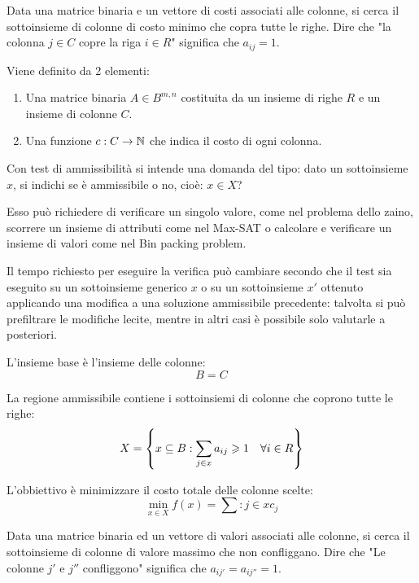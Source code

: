 \documentclass[\main/main.tex]{subfiles}
\begin{document}
\clearpage
\begin{multicols}{2}
    \begin{problem}
        Data una matrice binaria e un vettore di costi associati alle colonne, si cerca il sottoinsieme di colonne di costo minimo che copra tutte le righe. Dire che "la colonna \(j \in C\) copre la riga \(i \in R\)" significa che \(a_{ij} = 1\).
    
        Viene definito da 2 elementi:
        \begin{enumerate}
            \item Una matrice binaria \(A \in B^{m, n}\) costituita da un insieme di righe \(R\) e un insieme di colonne \(C\).
            \item Una funzione \(c: C \rightarrow \mathbb{N}\) che indica il costo di ogni colonna.
        \end{enumerate}
    \end{problem}
    \begin{observation}
        Con test di ammissibilità si intende una domanda del tipo: dato un sottoinsieme \(x\), si indichi se è ammissibile o no, cioè: \(x\in X\)?
        
        Esso può richiedere di verificare un singolo valore, come nel problema dello zaino, scorrere un insieme di attributi come nel Max-SAT o calcolare e verificare un insieme di valori come nel Bin packing problem.
        
        Il tempo richiesto per eseguire la verifica può cambiare secondo che il test sia eseguito su un sottoinsieme generico \(x\) o su un sottoinsieme \(x'\) ottenuto applicando una modifica a una soluzione ammissibile precedente: talvolta si può prefiltrare le modifiche lecite, mentre in altri casi è possibile solo valutarle a posteriori.
    \end{observation}
    \begin{definition}
        L'insieme base è l'insieme delle colonne:
        \[
            B = C
        \]
    \end{definition}
    \begin{definition}
        La regione ammissibile contiene i sottoinsiemi di colonne che coprono tutte le righe:
        \[
            X = \left\{x \subseteq B: \sum_{j \in x} a_{ij} \geqslant 1 \quad \forall i \in R\right\}
        \]
    \end{definition}
    \begin{definition}
        L'obbiettivo è minimizzare il costo totale delle colonne scelte:
        \[
            \min_{x \in X} f(x) = \sum:{j \in x} c_{j}
        \]
    \end{definition}
    \begin{problem}
        Data una matrice binaria ed un vettore di valori associati alle colonne, si cerca il sottoinsieme di colonne di valore massimo che non confliggano. Dire che "Le colonne \(j'\) e \(j''\) confliggono" significa che \(a_{ij'} = a_{ij''} = 1\).
        

\end{problem}
\end{multicols}
\end{document}
